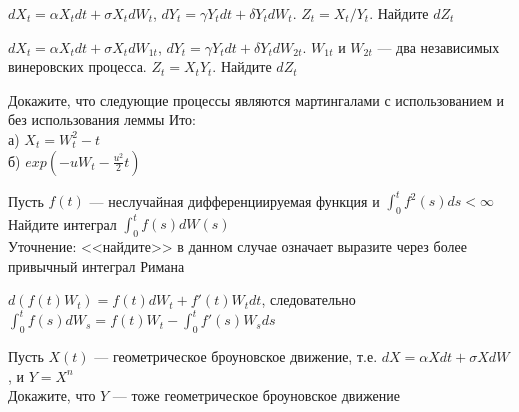 \begin{problem}
 $dX_{t}=\alpha X_{t}dt+\sigma X_{t}dW_{t}$, $dY_{t}=\gamma Y_{t}dt+\delta Y_{t}dW_{t}$. $Z_{t}=X_{t}/Y_{t}$. Найдите $dZ_{t}$ 
\end{problem} 
\begin{solution} 

\end{solution}

\begin{problem}
 $dX_{t}=\alpha X_{t}dt+\sigma X_{t}dW_{1t}$, $dY_{t}=\gamma Y_{t}dt+\delta Y_{t}dW_{2t}$. $W_{1t}$ и $W_{2t}$ --- два независимых винеровских процесса. $Z_{t}=X_{t}Y_{t}$. Найдите $dZ_{t}$ 
\end{problem} 
\begin{solution} 

\end{solution}

\begin{problem}
 Докажите, что следующие процессы являются мартингалами с использованием и без использования леммы Ито: \\
а) $X_{t}=W_{t}^{2}-t$ \\
б) $exp(-uW_{t}-\frac{u^{2}}{2}t)$ 
\end{problem} 
\begin{solution} 

\end{solution}

\begin{problem}
Пусть $f(t)$ --- неслучайная дифференциируемая функция и $\int_{0}^{t}f^{2}(s)ds<\infty$ \\
Найдите интеграл $\int_{0}^{t}f(s)dW(s)$ \\
Уточнение: <<найдите>> в данном случае означает выразите через более привычный интеграл Римана 
\end{problem} 
\begin{solution} 
 $d(f(t)W_t)=f(t)dW_t+f'(t)W_tdt$, следовательно $\int_0^t f(s)dW_s=f(t)W_t-\int_0^t f'(s)W_sds$ 
\end{solution}

\begin{problem}
Пусть $X(t)$ --- геометрическое броуновское движение, т.е. $dX=\alpha Xdt+\sigma XdW$, и $Y=X^{n}$ \\
Докажите, что $Y$ --- тоже геометрическое броуновское движение 
\end{problem} 
\begin{solution} 

\end{solution}

